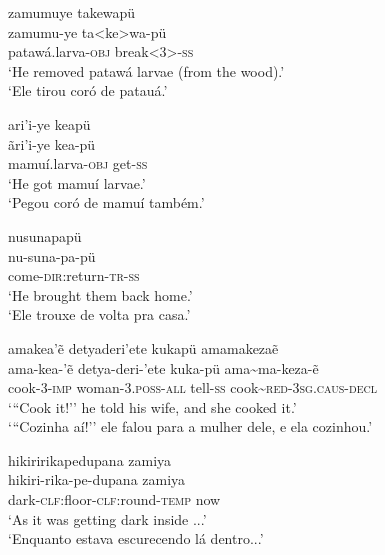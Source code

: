 \documentclass[output=paper,
modfonts,nonflat
]{langsci/langscibook}
\begin{document}
\z
 
\ea   zamumuye takewapü   \\[.3em]
\gll 	zamumu-ye ta<ke>wa-pü  \\
patawá.larva-\textsc{obj} break<3>-\textsc{ss}\\ 
\glt  `He removed patawá larvae (from the wood).' \\
`Ele tirou coró de patauá.'\\
\z
 
\newpage %
\ea  ari'i-ye keapü \\[.3em]
\gll 	 ãri'i-ye kea-pü \\
mamuí.larva-\textsc{obj} get-\textsc{ss} \\
\glt  `He got mamuí larvae.' \\
`Pegou coró de mamuí também.'   \\
\z

\ea    nusunapapü \\[.3em]
\gll 	nu-suna-pa-pü\\
come-\textsc{dir:}return-\textsc{tr-ss}\\
\glt   `He brought them back home.'\\
`Ele trouxe de volta pra casa.'\\ 
\z

\ea   amakea'ẽ detyaderi'ete kukapü amamakezaẽ \\[.3em]
\gll 	ama-kea-'ẽ detya-deri-'ete kuka-pü ama\textasciitilde ma-keza-ẽ\\
cook-\textsc{3-imp} woman-\textsc{3.poss-all} tell-\textsc{ss} cook\textasciitilde \textsc{red}-\textsc{3sg.caus-decl}\\
\glt    `{``}Cook it!'' he told his wife, and she cooked it.'  \\
`{``}Cozinha aí!'' ele falou para a mulher dele, e ela cozinhou.'\\ 
\z


\ea   hikiririkapedupana zamiya \\[.3em]
\gll 	hikiri-rika-pe-dupana zamiya \\
dark-\textsc{clf}:floor-\textsc{clf:}round-\textsc{temp} now\\
\glt   `As it was getting dark inside ...' \\
`Enquanto estava escurecendo lá dentro...' \\
\z
\end{document}

